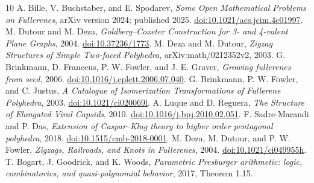 \documentclass[11pt]{amsart}
\begin{document}
\begin{thebibliography}{10}
 A. Bille, V. Buchstaber, and E. Spodarev,
\emph{Some Open Mathematical Problems on Fullerenes}, arXiv version
2024; published 2025. \href{https://doi.org/10.1021/acs.jcim.4c01997}{doi:10.1021/acs.jcim.4c01997}.
 M. Dutour and M. Deza,
\emph{Goldberg--Coxeter Construction for 3- and 4-valent Plane Graphs},
2004. \href{https://doi.org/10.37236/1773}{doi:10.37236/1773}.
 M. Deza and M. Dutour,
\emph{Zigzag Structures of Simple Two-faced Polyhedra},
arXiv:math/0212352v2, 2003.
 G. Brinkmann, D. Franceus, P. W. Fowler, and J. E. Graver,
\emph{Growing fullerenes from seed}, 2006.
\href{https://doi.org/10.1016/j.cplett.2006.07.040}{doi:10.1016/j.cplett.2006.07.040}.
 G. Brinkmann, P. W. Fowler, and C. Justus,
\emph{A Catalogue of Isomerization Transformations of Fullerene Polyhedra},
2003. \href{https://doi.org/10.1021/ci020069l}{doi:10.1021/ci020069l}.
 A. Luque and D. Reguera,
\emph{The Structure of Elongated Viral Capsids}, 2010.
\href{https://doi.org/10.1016/j.bpj.2010.02.051}{doi:10.1016/j.bpj.2010.02.051}.
 F. Sadre-Marandi and P. Das,
\emph{Extension of Caspar--Klug theory to higher order pentagonal polyhedra},
2018. \href{https://doi.org/10.1515/cmb-2018-0001}{doi:10.1515/cmb-2018-0001}.
 M. Deza, M. Dutour, and P. W. Fowler,
\emph{Zigzags, Railroads, and Knots in Fullerenes}, 2004.
\href{https://doi.org/10.1021/ci049955h}{doi:10.1021/ci049955h}.
 T. Bogart, J. Goodrick, and K. Woods,
\emph{Parametric Presburger arithmetic: logic, combinatorics, and
quasi-polynomial behavior}, 2017, Theorem 1.15.
\end{thebibliography}
\end{document}
